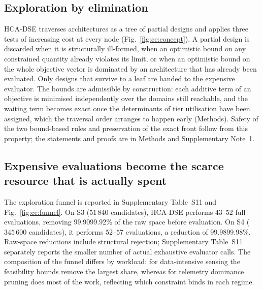 \documentclass[pdflatex,sn-nature,lineno]{sn-jnl}
\newcommand{\SthreeEvalRange}{43\text{--}52}
\newcommand{\SfourEvalRange}{52\text{--}57}
\newcommand{\RefFunnelSite}{Supplementary Table~S11 and Fig.~\ref{fig:ce:funnel}}
\newcommand{\RefFunnelTab}{Supplementary Table~S11}
\begin{document}
\subsection{Exploration by elimination}
HCA-DSE traverses architectures as a tree of partial designs and applies three tests of
increasing cost at every node (Fig.~\ref{fig:ce:concept}). A partial design is discarded
when it is structurally ill-formed, when an optimistic bound on any constrained quantity
already violates its limit, or when an optimistic bound on the whole objective vector is
dominated by an architecture that has already been evaluated. Only designs that survive
to a leaf are handed to the expensive evaluator. The bounds are admissible by
construction: each additive term of an objective is minimised independently over the
domains still reachable, and the waiting term becomes exact once the determinants of tier
utilisation have been assigned, which the traversal order arranges to happen early
(Methods). Safety of the two bound-based rules and preservation of the exact front follow
from this property; the statements and proofs are in Methods and Supplementary Note~1.

\subsection{Expensive evaluations become the scarce resource that is actually spent}
%
The exploration funnel is reported in \RefFunnelSite{}. On S3 ($51\,840$ candidates), HCA-DSE performs $\SthreeEvalRange$ full evaluations, removing 99.90\text{--}99.92\% of the raw space before evaluation. On S4 ($345\,600$ candidates), it performs $\SfourEvalRange$ evaluations, a reduction of 99.98\text{--}99.98\%. Raw-space reductions include structural rejection; \RefFunnelTab{} separately reports the smaller number of actual exhaustive evaluator calls.
The composition of the funnel differs by workload: for data-intensive sensing the
feasibility bounds remove the largest share, whereas for telemetry dominance pruning does
most of the work, reflecting which constraint binds in each regime.
\end{document}
